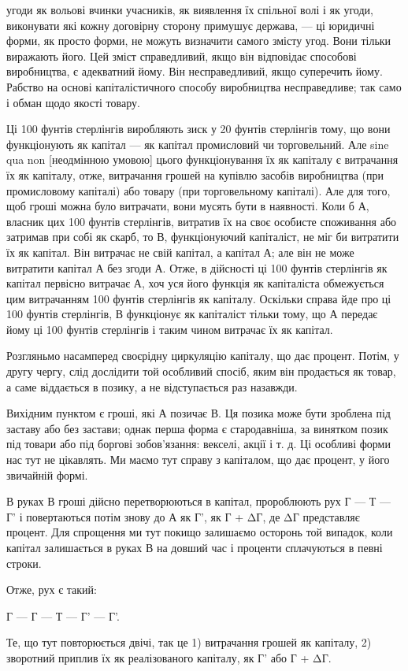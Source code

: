 угоди як вольові вчинки учасників, як виявлення їх спільної
волі і як угоди, виконувати які кожну договірну сторону примушує
держава, — ці юридичні форми, як просто форми, не можуть
визначити самого змісту угод. Вони тільки виражають його.
Цей зміст справедливий, якщо він відповідає способові виробництва,
є адекватний йому. Він несправедливий, якщо суперечить
йому. Рабство на основі капіталістичного способу виробництва
несправедливе; так само і обман щодо якості товару.

Ці 100 фунтів стерлінгів виробляють зиск у 20 фунтів стерлінгів
тому, що вони функціонують як капітал — як капітал
промисловий чи торговельний. Але sine qua non [неодмінною
умовою] цього функціонування їх як капіталу є витрачання їх
як капіталу, отже, витрачання грошей на купівлю засобів виробництва
(при промисловому капіталі) або товару (при торговельному
капіталі). Але для того, щоб гроші можна було витрачати,
вони мусять бути в наявності. Коли б А, власник цих
100 фунтів стерлінгів, витратив їх на своє особисте споживання
або затримав при собі як скарб, то В, функціонуючий капіталіст,
не міг би витратити їх як капітал. Він витрачає не свій
капітал, а капітал А; але він не може витратити капітал А без
згоди А. Отже, в дійсності ці 100 фунтів стерлінгів як капітал
первісно витрачає А, хоч уся його функція як капіталіста обмежується
цим витрачанням 100 фунтів стерлінгів як капіталу.
Оскільки справа йде про ці 100 фунтів стерлінгів, В функціонує
як капіталіст тільки тому, що А передає йому ці 100 фунтів
стерлінгів і таким чином витрачає їх як капітал.

Розгляньмо насамперед своєрідну циркуляцію капіталу, що
дає процент. Потім, у другу чергу, слід дослідити той особливий
спосіб, яким він продається як товар, а саме віддається
в позику, а не відступається раз назавжди.

Вихідним пунктом є гроші, які А позичає В. Ця позика може
бути зроблена під заставу або без застави; однак перша форма є
стародавніша, за винятком позик під товари або під боргові
зобов’язання: векселі, акції і т. д. Ці особливі форми нас тут
не цікавлять. Ми маємо тут справу з капіталом, що дає процент,
у його звичайній формі.

В руках В гроші дійсно перетворюються в капітал, пророблюють
рух Г — Т — Г' і повертаються потім знову до А як Г',
як Г + ΔГ, де ΔГ представляє процент. Для спрощення ми тут
покищо залишаємо осторонь той випадок, коли капітал залишається
в руках В на довший час і проценти сплачуються
в певні строки.

Отже, рух є такий:

Г — Г — Т — Г' — Г'.

Те, що тут повторюється двічі, так це 1) витрачання грошей
як капіталу, 2) зворотний приплив їх як реалізованого
капіталу, як Г' або Г + ΔГ.
